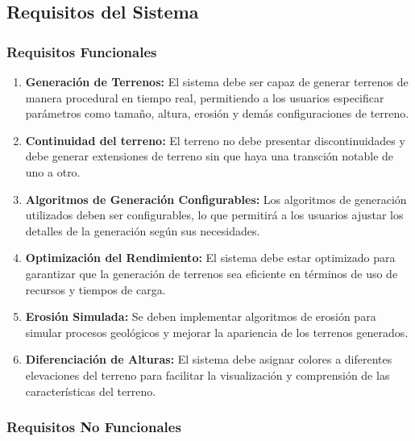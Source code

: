 \subsection{Requisitos del Sistema}

\subsubsection{Requisitos Funcionales}

\begin{enumerate}
    \item \textbf{Generación de Terrenos:} El sistema debe ser capaz de generar terrenos de manera procedural en tiempo real, permitiendo a los usuarios especificar parámetros como tamaño, altura, erosión y demás configuraciones de terreno.
    
    \item \textbf{Continuidad del terreno:} El terreno no debe presentar discontinuidades y debe generar extensiones de terreno sin que haya una transción notable de uno a otro.
    
    \item \textbf{Algoritmos de Generación Configurables:} Los algoritmos de generación utilizados deben ser configurables, lo que permitirá a los usuarios ajustar los detalles de la generación según sus necesidades.
    
    \item \textbf{Optimización del Rendimiento:} El sistema debe estar optimizado para garantizar que la generación de terrenos sea eficiente en términos de uso de recursos y tiempos de carga.
    
    \item \textbf{Erosión Simulada:} Se deben implementar algoritmos de erosión para simular procesos geológicos y mejorar la apariencia de los terrenos generados.
    
    \item \textbf{Diferenciación de Alturas:} El sistema debe asignar colores a diferentes elevaciones del terreno para facilitar la visualización y comprensión de las características del terreno.
\end{enumerate}

\subsubsection{Requisitos No Funcionales}

